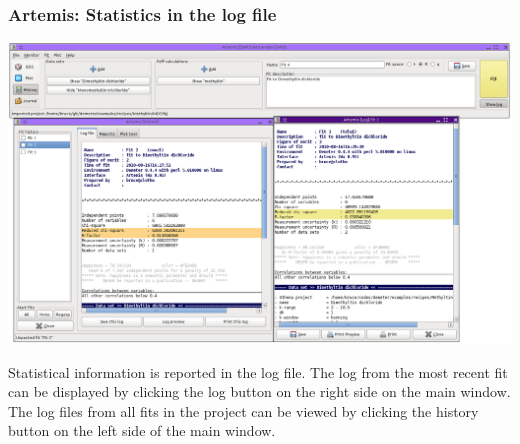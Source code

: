 \documentclass[10pt, xcolor=x11names, compress]{beamer}
\begin{document}

\begin{frame}
  \frametitle{Artemis: Statistics in the log file}
  \small%
  \begin{center}
    \includegraphics[width=0.9\linewidth]{info/log.png}

    Statistical information is reported in the log file.  The log from
    the most recent fit can be displayed by clicking the log button on
    the right side on the main window.  The log files from all fits in
    the project can be viewed by clicking the history button on the
    left side of the main window.
  \end{center}
\end{frame}


\end{document}
